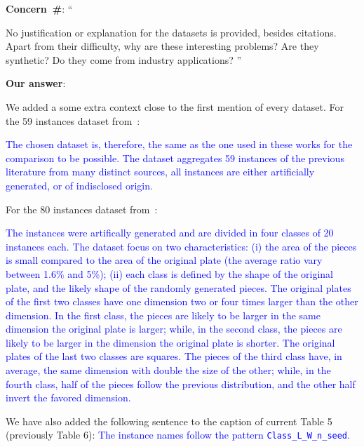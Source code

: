 \documentclass[smallextended]{svjour3}       %
\makeatletter
\newif\iffinalversion
\newcommand{\newtext}[1]{\iffinalversion%
#1%
\else%
\textcolor{blue}{#1}%
\fi%
}
\newcommand\gobblepars{%
    \@ifnextchar\par%
        {\expandafter\gobblepars\@gobble}%
        {}}
\newcounter{concern}
\newenvironment{concern}{%
    \refstepcounter{concern}\par\smallskip\noindent%
    \textbf{Concern~\#\theconcern}: ``\itshape\gobblepars}%
    {\unskip''\smallskip}
\newcounter{answer}
\newenvironment{answer}{%
    \refstepcounter{answer}\par\smallskip\noindent%
    \textbf{Our answer}: \gobblepars}%
    {\unskip\bigskip}
\makeatother
\begin{document}
\begin{concern}
No justification or explanation for the datasets is provided, besides citations. Apart from their difficulty, why are these interesting problems? Are they synthetic? Do they come from industry applications?
\end{concern}
\begin{answer}\label{ans:dataset_info}
We added a some extra context close to the first mention of every dataset. For the 59 instances dataset from~\cite{furini:2016}:

\newtext{The chosen dataset is, therefore, the same as the one used in these works for the comparison to be possible. The dataset aggregates 59 instances of the previous literature from many distinct sources, all instances are either artificially generated, or of indisclosed origin.}

For the 80 instances dataset from~\cite{velasco:2019}:

\newtext{The instances were artifically generated and are divided in four classes of 20 instances each. The dataset focus on two characteristics: (i) the area of the pieces is small compared to the area of the original plate (the average ratio vary between 1.6\% and 5\%); (ii) each class is defined by the shape of the original plate, and the likely shape of the randomly generated pieces. The original plates of the first two classes have one dimension two or four times larger than the other dimension. In the first class, the pieces are likely to be larger in the same dimension the original plate is larger; while, in the second class, the pieces are likely to be larger in the dimension the original plate is shorter. The original plates of the last two classes are squares. The pieces of the third class have, in average, the same dimension with double the size of the other; while, in the fourth class, half of the pieces follow the previous distribution, and the other half invert the favored dimension.}

We have also added the following sentence to the caption of current Table 5 (previously Table 6): \newtext{The instance names follow the pattern \texttt{Class\_L\_W\_n\_seed}.}
\end{answer}
\end{document}
